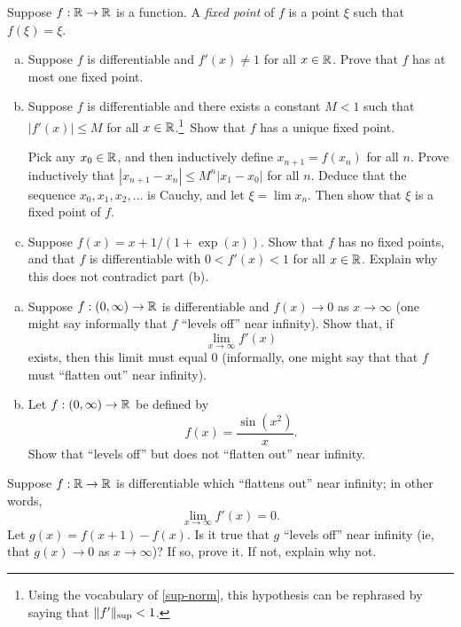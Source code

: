\begin{exercise} \label{fixed-points}
	Suppose $f : \mathbb{R} \to \mathbb{R}$ is a function. A \emph{fixed point} of $f$ is a point $\xi$ such that $f(\xi) = \xi$. 
	\begin{enumerate}[(a)]
		\item Suppose $f$ is differentiable and $f'(x) \neq 1$ for all $x \in \mathbb{R}$. Prove that $f$ has at most one fixed point. 
		\item Suppose $f$ is differentiable and there exists a constant $M < 1$ such that $|f'(x)| \leq M$ for all $x \in \mathbb{R}$.\footnote{Using the vocabulary of \cref{sup-norm}, this hypothesis can be rephrased by saying that $\|f'\|_{\mathrm{sup}} < 1$.}\ Show that $f$ has a unique fixed point.  
		
		\begin{hint}
			Pick any $x_0 \in \mathbb{R}$, and then inductively define $x_{n+1} = f(x_n)$ for all $n$. Prove inductively that $|x_{n+1} - x_n| \leq M^n|x_1 - x_0|$ for all $n$. Deduce that the sequence $x_0, x_1, x_2, \dotsc$ is Cauchy, and let $\xi = \lim x_n$. Then show that $\xi$ is a fixed point of $f$. 
		\end{hint}
	
		\item Suppose $f(x) = x + 1/(1 + \exp(x))$.
		Show that $f$ has no fixed points, and that $f$ is differentiable with $0 < f'(x) < 1$ for all $x \in \mathbb{R}$. Explain why this does not contradict part (b). 
	\end{enumerate}
\end{exercise}

\begin{exercise} \label{leveling-off-vs-flattening-out}
	\begin{enumerate}[(a)]
		\item Suppose $f : (0, \infty) \to \mathbb{R}$ is differentiable and $f(x) \to 0$ as $x \to \infty$ (one might say informally that $f$ ``levels off'' near infinity). Show that, if 
		\[ \lim_{x \to \infty} f'(x) \]
		exists, then this limit must equal 0 (informally, one might say that that $f$ must ``flatten out'' near infinity).
		\item Let $f : (0, \infty) \to \mathbb{R}$ be defined by 
		\[ f(x) = \frac{\sin(x^2)}{x}. \]
		Show that ``levels off'' but does not ``flatten out'' near infinity.  
	\end{enumerate}
\end{exercise}

\begin{exercise}
	Suppose $f : \mathbb{R} \to \mathbb{R}$ is differentiable which ``flattens out'' near infinity; in other words, \[ \lim_{x \to \infty} f'(x) = 0. \] Let $g(x) = f(x+1) - f(x)$. Is it true that $g$ ``levels off'' near infinity (ie, that $g(x) \to 0$ as $x \to \infty$)? If so, prove it. If not, explain why not. 
\end{exercise}

